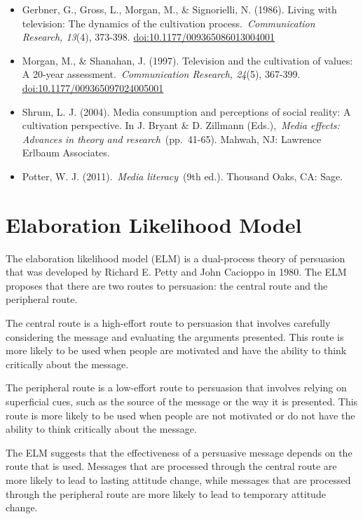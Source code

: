 \documentclass[
  b5paper]{book}
\begin{document}
\begin{itemize}
\item
  Gerbner, G., Gross, L., Morgan, M., \& Signorielli, N. (1986). Living with television: The dynamics of the cultivation process.~\emph{Communication Research, 13}(4), 373-398. \url{doi:10.1177/009365086013004001}
\item
  Morgan, M., \& Shanahan, J. (1997). Television and the cultivation of values: A 20-year assessment.~\emph{Communication Research, 24}(5), 367-399. \url{doi:10.1177/009365097024005001}
\item
  Shrum, L. J. (2004). Media consumption and perceptions of social reality: A cultivation perspective. In J. Bryant \& D. Zillmann (Eds.),~\emph{Media effects: Advances in theory and research}~(pp.~41-65). Mahwah, NJ: Lawrence Erlbaum Associates.
\item
  Potter, W. J. (2011).~\emph{Media literacy}~(9th ed.). Thousand Oaks, CA: Sage.
\end{itemize}

\hypertarget{elaboration-likelihood-model}{%
\section{Elaboration Likelihood Model}\label{elaboration-likelihood-model}}

The elaboration likelihood model (ELM) is a dual-process theory of persuasion that was developed by Richard E. Petty and John Cacioppo in 1980. The ELM proposes that there are two routes to persuasion: the central route and the peripheral route.

The central route is a high-effort route to persuasion that involves carefully considering the message and evaluating the arguments presented. This route is more likely to be used when people are motivated and have the ability to think critically about the message.

The peripheral route is a low-effort route to persuasion that involves relying on superficial cues, such as the source of the message or the way it is presented. This route is more likely to be used when people are not motivated or do not have the ability to think critically about the message.

The ELM suggests that the effectiveness of a persuasive message depends on the route that is used. Messages that are processed through the central route are more likely to lead to lasting attitude change, while messages that are processed through the peripheral route are more likely to lead to temporary attitude change.
\end{document}
